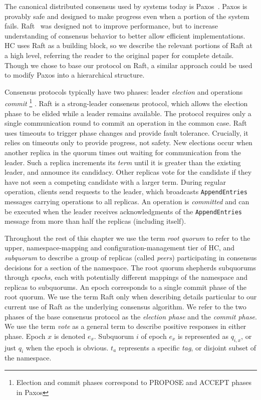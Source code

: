 The canonical distributed consensus used by systems today is Paxos~\cite{paxos,paxos_simple}.
Paxos is provably safe and designed to make progress even when a portion of the system fails.
Raft~\cite{raft} was designed not to improve performance, but to increase understanding of consensus behavior to better allow efficient implementations.
HC uses Raft as a building block, so we describe the relevant portions of Raft at a high level, referring the reader to the original paper for complete details.
Though we chose to base our protocol on Raft, a similar approach could be used to modify Paxos into a hierarchical structure.

Consensus protocols typically have two phases: leader \emph{election} and operations \emph{commit}\renewcommand{\baselinestretch}{1} \small\footnotesize\footnote{Election and commit phases correspond to PROPOSE and ACCEPT phases in Paxos}\renewcommand{\baselinestretch}{2} \small\normalsize.
Raft is a strong-leader consensus protocol, which allows the election phase to be elided while a leader remains available.
The protocol requires only a single communication round to commit an operation in the common case.
Raft uses timeouts to trigger phase changes and provide fault tolerance.
Crucially, it relies on timeouts only to provide progress, not safety.
New elections occur when another replica in the quorum times out waiting for communication from the leader.
Such a replica increments its \emph{term} until it is greater than the existing leader, and announce its candidacy.
Other replicas vote for the candidate if they have not seen a competing candidate with a larger term.
During regular operation, clients send requests to the leader, which broadcasts \texttt{AppendEntries} messages carrying operations to all replicas.
An operation is \emph{committed} and can be executed when the leader receives acknowledgments of the \texttt{AppendEntries} message from more than half the replicas (including itself).


Throughout the rest of this chapter we use the term \emph{root quorum} to refer to the upper, namespace-mapping and configuration-management tier of HC, and \emph{subquorum} to describe a group of replicas (called \emph{peers}) participating in consensus decisions for a section of the namespace.
The root quorum shepherds subquorums through \emph{epochs}, each with potentially different mappings of the namespace and replicas to subquorums.
An epoch corresponds to a single commit phase of the root quorum.
We use the term Raft only when describing details particular to our current use of Raft as the underlying consensus algorithm.
We refer to the two phases of the base consensus protocol as the \emph{election phase} and the \emph{commit phase}.
We use the term \emph{vote} as a general term to describe positive responses in either phase.
Epoch $x$ is denoted $e_x$.
Subquorum $i$ of epoch $e_x$ is represented as $q_{i,x}$, or just $q_i$ when the epoch is obvious.
$t_a$ represents a specific \emph{tag}, or disjoint subset of the namespace.

